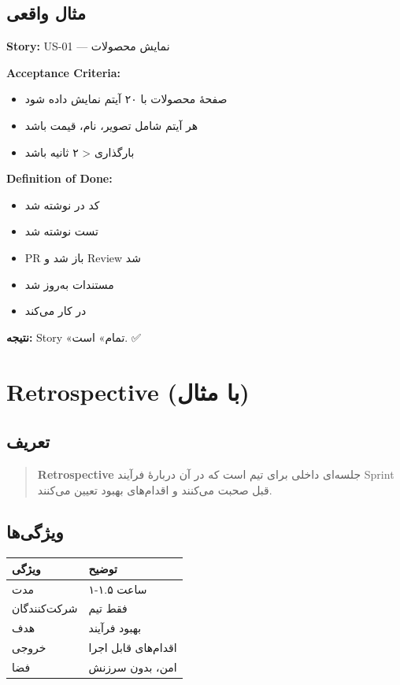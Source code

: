 \documentclass[12pt, a4paper]{article}
\begin{document}
\subsection{مثال واقعی}

\textbf{Story:} US-01 — نمایش محصولات

\textbf{Acceptance Criteria:}
\begin{itemize}
    \item[$\square$] صفحهٔ محصولات با ۲۰ آیتم نمایش داده شود
    \item[$\square$] هر آیتم شامل تصویر، نام، قیمت باشد
    \item[$\square$] بارگذاری < ۲ ثانیه باشد
\end{itemize}

\textbf{Definition of Done:}
\begin{itemize}
    \item[$\square$] کد در  نوشته شد
    \item[$\square$] تست  نوشته شد
    \item[$\square$] PR باز شد و Review شد
    \item[$\square$] مستندات  به‌روز شد
    \item[$\square$] در  کار می‌کند
\end{itemize}

\textbf{نتیجه:} Story «تمام» است. ✅

\section{Retrospective (با مثال)}

\subsection{تعریف}
\begin{quote}
\textbf{Retrospective} جلسه‌ای داخلی برای تیم است که در آن دربارهٔ فرآیند 
Sprint قبل صحبت می‌کنند و اقدام‌های بهبود تعیین می‌کنند.
\end{quote}

\subsection{ویژگی‌ها}

\begin{center}
\begin{tabular}{|l|p{9cm}|}
\hline
\textbf{ویژگی} & \textbf{توضیح} \\
\hline
مدت & ۱-۱.۵ ساعت \\
\hline
شرکت‌کنندگان & فقط تیم \\
\hline
هدف & بهبود فرآیند \\
\hline
خروجی & اقدام‌های قابل اجرا \\
\hline
فضا & امن، بدون سرزنش \\
\hline
\end{tabular}
\end{center}
\end{document}
